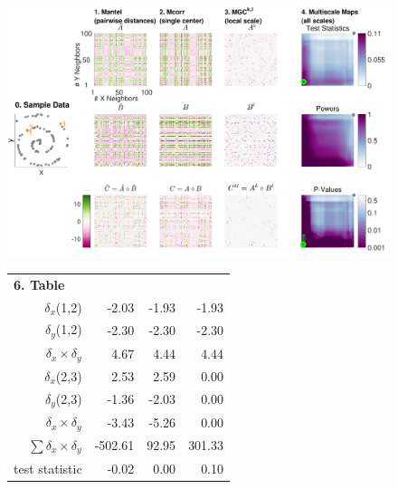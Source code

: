 \documentclass[11pt]{article}
\begin{document}
\begin{figure}[htbp]
\vspace{-50pt}
\includegraphics[width=1.0\textwidth,trim={0 0 0.75cm 0},clip]{Figures/FigA}
\setlength{\tabcolsep}{10pt} %
\begin{tabular}{r r r r}
\multicolumn{1}{l}{{\small \textbf{6. Table}}} & & & \\
$\delta_x$(1,2)   & \hspace{1.5em} \color{magenta}-2.03  & \hspace{3.5em} \color{magenta}-1.93  &  \hspace{3.0em} \color{magenta}-1.93  \\ 
 $\delta_y$(1,2) & \color{magenta}-2.30 & \color{magenta}-2.30 & \color{magenta}-2.30  \\ 
 $\delta_x \times \delta_y$ & \color{green}4.67 & \color{green}4.44 & \color{green}4.44  \\ 
 
\hline

 $\delta_x$(2,3) & \color{green}2.53 & \color{green}2.59 & 0.00  \\ 
 $\delta_y$(2,3) &  \color{magenta}-1.36 & \color{magenta}-2.03 & 0.00  \\ 
 $\delta_x \times \delta_y$ & \color{magenta}-3.43 & \color{magenta}-5.26 & 0.00  \\ 

\hline
 $\sum{\delta_x \times \delta_y}$ & \color{magenta}-502.61   & \color{green}92.95 & \color{green}301.33  \\ 
 test statistic &  \color{magenta}-0.02  & 0.00 & \color{green}0.10  \\  
\end{tabular}


\end{figure}
\end{document}
